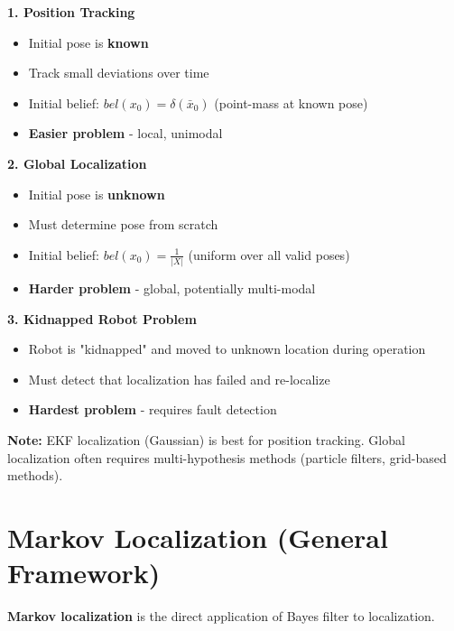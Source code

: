 \begin{tcolorbox}[colback=blue!5!white,colframe=blue!75!black,title=Localization Problem Types]

\textbf{1. Position Tracking}
\begin{itemize}
    \item Initial pose is \textbf{known}
    \item Track small deviations over time
    \item Initial belief: $bel(x_0) = \delta(\bar{x}_0)$ (point-mass at known pose)
    \item \textbf{Easier problem} - local, unimodal
\end{itemize}

\textbf{2. Global Localization}
\begin{itemize}
    \item Initial pose is \textbf{unknown}
    \item Must determine pose from scratch
    \item Initial belief: $bel(x_0) = \frac{1}{|X|}$ (uniform over all valid poses)
    \item \textbf{Harder problem} - global, potentially multi-modal
\end{itemize}

\textbf{3. Kidnapped Robot Problem}
\begin{itemize}
    \item Robot is "kidnapped" and moved to unknown location during operation
    \item Must detect that localization has failed and re-localize
    \item \textbf{Hardest problem} - requires fault detection
\end{itemize}

\end{tcolorbox}

\textbf{Note:} EKF localization (Gaussian) is best for position tracking. Global localization often requires multi-hypothesis methods (particle filters, grid-based methods).

\section{Markov Localization (General Framework)}

\textbf{Markov localization} is the direct application of Bayes filter to localization.

